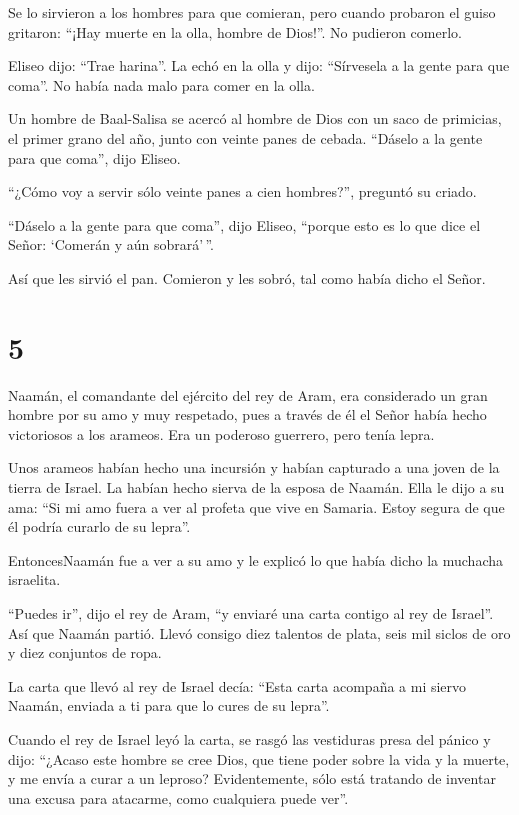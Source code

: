  Se lo sirvieron a los hombres para que comieran, pero
cuando probaron el guiso gritaron: ``¡Hay muerte en la olla, hombre de
Dios!''. No pudieron comerlo.

 Eliseo dijo: ``Trae harina''. La echó en la olla y dijo:
``Sírvesela a la gente para que coma''. No había nada malo para comer en
la olla.

 Un hombre de Baal-Salisa se acercó al hombre de Dios con
un saco de primicias, el primer grano del año, junto con veinte panes de
cebada. ``Dáselo a la gente para que coma'', dijo Eliseo.

 ``¿Cómo voy a servir sólo veinte panes a cien hombres?'',
preguntó su criado.

``Dáselo a la gente para que coma'', dijo Eliseo, ``porque esto es lo
que dice el Señor: `Comerán y aún sobrará'\,''.

 Así que les sirvió el pan. Comieron y les sobró, tal como
había dicho el Señor.

\hypertarget{section-4}{%
\section{5}\label{section-4}}

 Naamán, el comandante del ejército del rey de Aram, era
considerado un gran hombre por su amo y muy respetado, pues a través de
él el Señor había hecho victoriosos a los arameos. Era un poderoso
guerrero, pero tenía lepra.

 Unos arameos habían hecho una incursión y habían capturado
a una joven de la tierra de Israel. La habían hecho sierva de la esposa
de Naamán.  Ella le dijo a su ama: ``Si mi amo fuera a ver
al profeta que vive en Samaria. Estoy segura de que él podría curarlo de
su lepra''.

 EntoncesNaamán fue a ver a su amo y le explicó lo que había
dicho la muchacha israelita.

 ``Puedes ir'', dijo el rey de Aram, ``y enviaré una carta
contigo al rey de Israel''. Así que Naamán partió. Llevó consigo diez
talentos de plata, seis mil siclos de oro y diez conjuntos de ropa.

 La carta que llevó al rey de Israel decía: ``Esta carta
acompaña a mi siervo Naamán, enviada a ti para que lo cures de su
lepra''.

 Cuando el rey de Israel leyó la carta, se rasgó las
vestiduras presa del pánico y dijo: ``¿Acaso este hombre se cree Dios,
que tiene poder sobre la vida y la muerte, y me envía a curar a un
leproso? Evidentemente, sólo está tratando de inventar una excusa para
atacarme, como cualquiera puede ver''.

